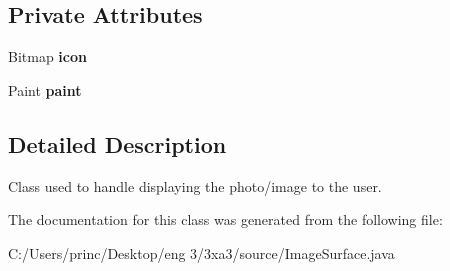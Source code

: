 \subsection*{Private Attributes}
\begin{DoxyCompactItemize}
\item 
\mbox{\label{classgroup10_1_1_image_surface_aa14008274261258bdf3df75456e47c65}} 
Bitmap {\bfseries icon}
\item 
\mbox{\label{classgroup10_1_1_image_surface_a00b13a5d8db1f4ca0ae28f725b043145}} 
Paint {\bfseries paint}
\end{DoxyCompactItemize}


\subsection{Detailed Description}
Class used to handle displaying the photo/image to the user. 

The documentation for this class was generated from the following file\+:\begin{DoxyCompactItemize}
\item 
C\+:/\+Users/princ/\+Desktop/eng 3/3xa3/source/Image\+Surface.\+java\end{DoxyCompactItemize}
